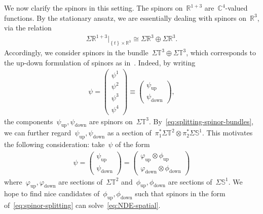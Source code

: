 \documentclass[10pt,a4paper]{amsart}
\newcommand{\R}{\mathbb{R}}
\newcommand{\C}{\mathbb{C}}
\newcommand{\T}{\mathbb{T}}
\newcommand{\sph}{\mathbb{S}}
\newcommand{\braces}[1]{\left\{#1\right\}} %
\DeclareMathOperator{\up}{up}
\DeclareMathOperator{\down}{down}
\begin{document}
We now clarify the spinors in this setting. 
The spinors on~$\R^{1+3}$ are~$\C^4$-valued functions. 
By the stationary ansatz, we are essentially dealing with spinors on~$\R^3$, via the relation 
\begin{align}
    \Sigma\R^{1+3}|_{\braces{t}\times \R^3}\cong \Sigma\R^3 \oplus \Sigma \R^3. 
\end{align}
Accordingly, we consider spinors in the bundle~$\Sigma\T^3\oplus\Sigma\T^3$, which corresponds to the up-down formulation of spinors as in~\cite{WZ2026Stationary}. 
Indeed, by writing
\begin{align}\label{eq:up-down}
    \psi= \begin{pmatrix}\psi^1\\ \psi^2 \\ \psi^3 \\ \psi^4\end{pmatrix}
    \equiv \begin{pmatrix} \psi_{\up} \\ \psi_{\down} \end{pmatrix}, 
\end{align}
the components~$\psi_{\up},\psi_{\down}$ are spinors on~$\Sigma \T^3$.
By~\eqref{eq:splitting-spinor-bundles}, we can further regard~$\psi_{\up},\psi_{\down}$ as a section of~$\pi_1^*\Sigma\T^2\otimes\pi_2^*\Sigma\sph^1$.
This motivates the following consideration: take~$\psi$ of the form
\begin{align}\label{eq:spinor-splitting}
    \psi= \begin{pmatrix}
        \psi_{\up} \\ \psi_{\down}
    \end{pmatrix}
    = 
    \begin{pmatrix}
        \varphi_{\up}\otimes \phi_{\up} \\ 
        \varphi_{\down}\otimes \phi_{\down}
    \end{pmatrix}
\end{align}
where~$\varphi_{\up},\varphi_{\down}$ are sections of~$\Sigma\T^2$ and~$\phi_{\up},\phi_{\down}$ are sections of~$\Sigma\sph^1$.
We hope to find nice candidates of~$\phi_{\up},\phi_{\down}$ such that spinors in the form of~\eqref{eq:spinor-splitting} can solve~\eqref{eq:NDE-spatial}.

\ 
\end{document}
